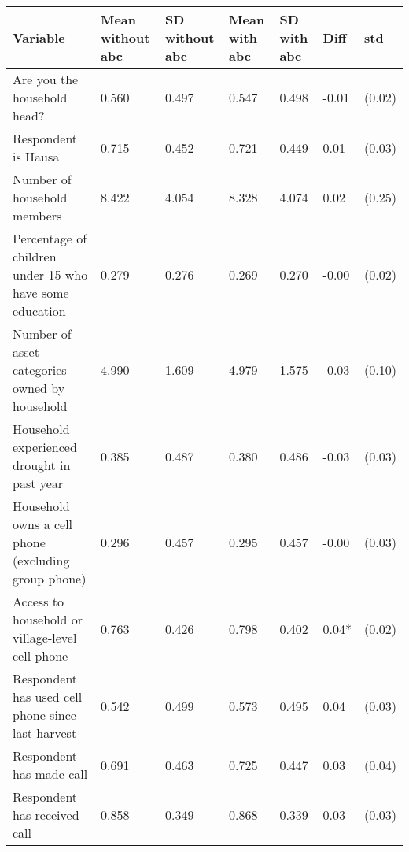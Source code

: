 \begin{tabular}{lllllll}
\toprule
Variable & Mean without abc & SD without abc & Mean with abc & SD with abc & Diff & std \\
\midrule
Are you the household head? & 0.560 & 0.497 & 0.547 & 0.498 & -0.01 & (0.02) \\
Respondent is Hausa & 0.715 & 0.452 & 0.721 & 0.449 & 0.01 & (0.03) \\
Number of household members & 8.422 & 4.054 & 8.328 & 4.074 & 0.02 & (0.25) \\
Percentage of children under 15 who have some education & 0.279 & 0.276 & 0.269 & 0.270 & -0.00 & (0.02) \\
Number of asset categories owned by household & 4.990 & 1.609 & 4.979 & 1.575 & -0.03 & (0.10) \\
Household experienced drought in past year & 0.385 & 0.487 & 0.380 & 0.486 & -0.03 & (0.03) \\
Household owns a cell phone (excluding group phone) & 0.296 & 0.457 & 0.295 & 0.457 & -0.00 & (0.03) \\
Access to household or village-level cell phone & 0.763 & 0.426 & 0.798 & 0.402 & 0.04* & (0.02) \\
Respondent has used cell phone since last harvest & 0.542 & 0.499 & 0.573 & 0.495 & 0.04 & (0.03) \\
Respondent has made call & 0.691 & 0.463 & 0.725 & 0.447 & 0.03 & (0.04) \\
Respondent has received call & 0.858 & 0.349 & 0.868 & 0.339 & 0.03 & (0.03) \\
\bottomrule
\end{tabular}
